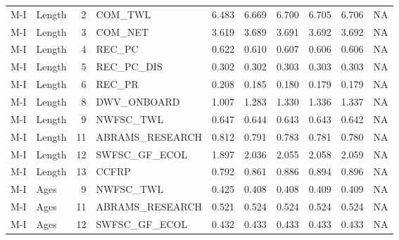 \documentclass[
  english,
  a4paper,
]{article}
\begin{document}
\begin{landscape}
\begin{table}
{\begin{tabular}[t]{llrlrrrrrl}
M-I & Length & 2 & COM\_TWL & 6.483 & 6.669 & 6.700 & 6.705 & 6.706 & NA\\
M-I & Length & 3 & COM\_NET & 3.619 & 3.689 & 3.691 & 3.692 & 3.692 & NA\\
M-I & Length & 4 & REC\_PC & 0.622 & 0.610 & 0.607 & 0.606 & 0.606 & NA\\
M-I & Length & 5 & REC\_PC\_DIS & 0.302 & 0.302 & 0.303 & 0.303 & 0.303 & NA\\
M-I & Length & 6 & REC\_PR & 0.208 & 0.185 & 0.180 & 0.179 & 0.179 & NA\\
M-I & Length & 8 & DWV\_ONBOARD & 1.007 & 1.283 & 1.330 & 1.336 & 1.337 & NA\\
M-I & Length & 9 & NWFSC\_TWL & 0.647 & 0.644 & 0.643 & 0.643 & 0.642 & NA\\
M-I & Length & 11 & ABRAMS\_RESEARCH & 0.812 & 0.791 & 0.783 & 0.781 & 0.780 & NA\\
M-I & Length & 12 & SWFSC\_GF\_ECOL & 1.897 & 2.036 & 2.055 & 2.058 & 2.059 & NA\\
M-I & Length & 13 & CCFRP & 0.792 & 0.861 & 0.886 & 0.894 & 0.896 & NA\\
M-I & Ages & 9 & NWFSC\_TWL & 0.425 & 0.408 & 0.408 & 0.409 & 0.409 & NA\\
M-I & Ages & 11 & ABRAMS\_RESEARCH & 0.521 & 0.524 & 0.524 & 0.524 & 0.524 & NA\\
M-I & Ages & 12 & SWFSC\_GF\_ECOL & 0.432 & 0.433 & 0.433 & 0.433 & 0.433 & NA\\
\bottomrule
\end{tabular}}
\end{table}
\end{landscape}
\end{document}
